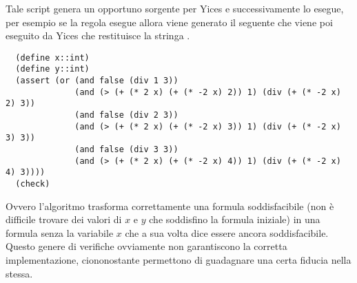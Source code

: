 \documentclass[11pt,letterpaper,twoside]{article}
\begin{document}
\inputminted[linenos]{python}{../sat.py}

Tale script genera un opportuno sorgente  per
Yices\autocite{yices} e successivamente lo esegue, per esempio se la regola
 esegue  allora viene generato il seguente  che viene poi
eseguito da Yices che restituisce la stringa .

\begin{verbatim}
  (define x::int)
  (define y::int)
  (assert (or (and false (div 1 3))
              (and (> (+ (* 2 x) (+ (* -2 x) 2)) 1) (div (+ (* -2 x) 2) 3))
              (and false (div 2 3))
              (and (> (+ (* 2 x) (+ (* -2 x) 3)) 1) (div (+ (* -2 x) 3) 3))
              (and false (div 3 3))
              (and (> (+ (* 2 x) (+ (* -2 x) 4)) 1) (div (+ (* -2 x) 4) 3))))
  (check)
\end{verbatim}

Ovvero l'algoritmo trasforma correttamente una formula soddisfacibile (non è
difficile trovare dei valori di $x$ e $y$ che soddisfino la formula iniziale) in
una formula senza la variabile $x$ che a sua volta  dice essere
ancora soddisfacibile. Questo genere di verifiche ovviamente non garantiscono la
corretta implementazione, ciononostante permettono di guadagnare una certa
fiducia nella stessa.


\newpage
\tableofcontents

\newpage
\printbibliography
\end{document}
